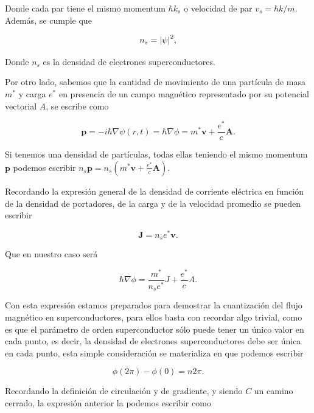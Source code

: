 Donde cada par tiene el mismo momentum $\hbar k_s$ o velocidad de par $v_s = \hbar k/m$. Además, se cumple que

\begin{equation}
    n_s = \abs{\psi}^2 ,
\end{equation}
    
Donde $n_s$ es la densidad de electrones superconductores.

Por otro lado, sabemos que la cantidad de movimiento de una partícula de masa $m^*$ y carga $e^*$ en presencia de un campo magnético representado por su potencial vectorial $A$, se escribe como

\begin{equation}
    \mathbf{p} = -i \hbar \nabla \psi(r,t) = \hbar \nabla \phi = m^* \mathbf{v} + \frac{e^*}{c} \mathbf{A} .
\end{equation}

Si tenemos una densidad de partículas, todas ellas teniendo el mismo momentum $\mathbf{p}$ podemos escribir $n_s \mathbf{p} = n_s (m^* \mathbf{v} + \frac{e^*}{c} \mathbf{A})$.

Recordando la expresión general de la densidad de corriente eléctrica en función de la densidad de portadores, de la carga y de la velocidad promedio se pueden escribir

\begin{equation}
    \mathbf{J} = n_s e^* \mathbf{v} .
\end{equation}

Que en nuestro caso será

\begin{equation}
    \hbar \nabla \phi = \frac{m^*}{n_s e^*} J + \frac{e^*}{c} A .
\end{equation}

Con esta expresión estamos preparados para demostrar la cuantización del flujo magnético en superconductores, para ellos basta con recordar algo trivial, como es que el parámetro de orden superconductor sólo puede tener un único valor en cada punto, es decir, la densidad de electrones superconductores debe ser única en cada punto, esta simple consideración se materializa en que podemos escribir

\begin{equation}
    \phi(2\pi) - \phi(0) = n 2 \pi .
\end{equation}

Recordando la definición de circulación y de gradiente, y siendo $C$ un camino cerrado, la expresión anterior la podemos escribir como

